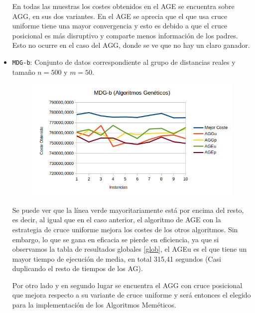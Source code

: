 \begin{itemize}
	En todas las muestras los costes obtenidos en el  AGE se encuentra sobre AGG, en sus dos variantes. En el AGE se aprecia que el que usa cruce uniforme tiene una mayor convergencia y esto es debido a que el cruce posicional es más disruptivo y comparte menos información de los padres. Esto no ocurre en el caso del AGG, donde se ve que no hay un claro ganador.
	
	
	

	
	
	
	\item \texttt{MDG-b}: Conjunto de datos correspondiente al grupo de distancias reales y tamaño $n=500$ y $m=50$. 
	
	
		
	\begin{figure}[H]
		\centering
		\includegraphics[scale=0.6]{img/mdgb.png}
	\end{figure}
	
	Se puede ver que la línea verde mayoritariamente está por encima del resto, es decir,
	al igual que en el caso anterior, el algoritmo de AGE con la estrategia de cruce uniforme mejora los costes de los otros algoritmos. Sin embargo, lo que se gana en eficacia se pierde en eficiencia, ya que si observamos la tabla de resultados globales \ref{glob}, el AGEu es el que tiene un mayor tiempo de ejecución de media, en total 315,41 segundos (Casi duplicando el resto de tiempos de los AG).
	
	
	Por otro lado y en segundo lugar se encuentra el AGG con cruce posicional que mejora respecto a su variante de cruce uniforme y será entonces el elegido para la implementación de los Algoritmos Meméticos.
	
	
	

	
\end{itemize}




